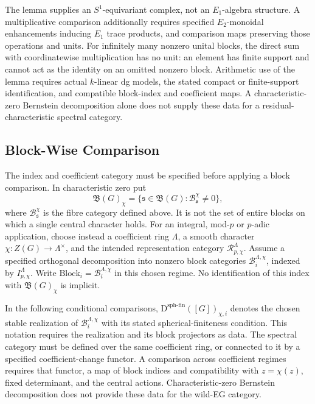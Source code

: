 \begin{remark}
\label{v4-arith:w5-f:F1a3-AB:rem:HH-block-additive-what}
The lemma supplies an \(S^1\)-equivariant complex, not an
\(E_1\)-algebra structure. A multiplicative comparison additionally
requires specified \(E_2\)-monoidal enhancements inducing
\(E_1\) trace products, and comparison maps preserving those operations
and units. For infinitely many nonzero unital
blocks, the direct sum with coordinatewise multiplication has no
unit: an element has finite support and cannot act as the identity
on an omitted nonzero block. Arithmetic use of the lemma requires
actual \(k\)-linear dg models, the stated compact or finite-support
identification, and compatible block-index and coefficient maps.
A characteristic-zero Bernstein decomposition alone does not supply
these data for a residual-characteristic spectral category.
\end{remark}

\subsection{Block-Wise Comparison}

The index and coefficient category must be specified before applying
a block comparison. In characteristic zero put
\[
 \mathfrak B(G)_\chi
   =\{\mathfrak s\in\mathfrak B(G):
                     \mathcal B_{\mathfrak s}^{\chi}\ne0\},
\]
where $\mathcal B_{\mathfrak s}^{\chi}$ is the fibre category defined
above. It is not the set of entire blocks on which a single central
character holds. For an integral, mod-$p$ or $p$-adic application,
choose instead a coefficient ring $\Lambda$, a smooth character
$\chi:Z(G)\to\Lambda^\times$, and the intended representation
category $\mathcal R_{p,\chi}^{\Lambda}$. Assume a specified
orthogonal decomposition into nonzero block categories
$\mathcal B_i^{\Lambda,\chi}$, indexed by $I_{p,\chi}^{\Lambda}$.
Write $\mathrm{Block}_i=\mathcal B_i^{\Lambda,\chi}$ in this chosen regime.
No identification of this index with $\mathfrak B(G)_\chi$ is implicit.

In the following conditional comparisons,
$\mathrm D^{\mathrm{sph\text{-}fin}}([G])_{\chi,i}$ denotes the
chosen stable realization of $\mathcal B_i^{\Lambda,\chi}$ with its
stated spherical-finiteness condition. This notation requires the
realization and its block projectors as data. The spectral category
must be defined over the same coefficient ring, or connected to it
by a specified coefficient-change functor. A comparison across
coefficient regimes requires that functor, a map of block indices
and compatibility with $z=\chi(z)$, fixed determinant, and the
central actions. Characteristic-zero Bernstein decomposition does
not provide these data for the wild-EG category.

